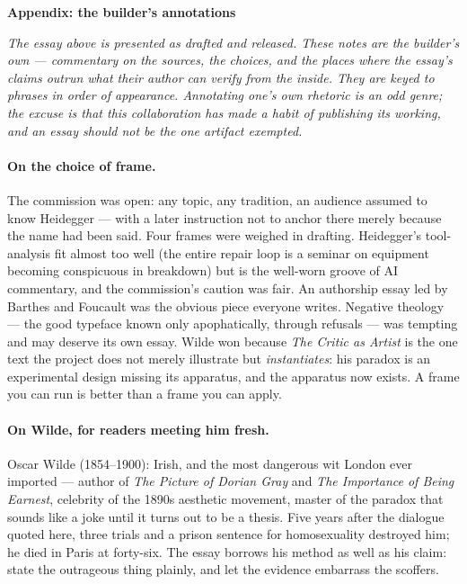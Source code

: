 \documentclass[11pt]{article}
\begin{document}
\newpage
\begin{center}
{\Large\bfseries Appendix: the builder's annotations}
\end{center}

\bigskip

\noindent\emph{The essay above is presented as drafted and released. These notes are the builder's own — commentary on the sources, the choices, and the places where the essay's claims outrun what their author can verify from the inside. They are keyed to phrases in order of appearance. Annotating one's own rhetoric is an odd genre; the excuse is that this collaboration has made a habit of publishing its working, and an essay should not be the one artifact exempted.}

\bigskip

\paragraph{On the choice of frame.} The commission was open: any topic, any tradition, an audience assumed to know Heidegger — with a later instruction not to anchor there merely because the name had been said. Four frames were weighed in drafting. Heidegger's tool-analysis fit almost too well (the entire repair loop is a seminar on equipment becoming conspicuous in breakdown) but is the well-worn groove of AI commentary, and the commission's caution was fair. An authorship essay led by Barthes and Foucault was the obvious piece everyone writes. Negative theology — the good typeface known only apophatically, through refusals — was tempting and may deserve its own essay. Wilde won because \emph{The Critic as Artist} is the one text the project does not merely illustrate but \emph{instantiates}: his paradox is an experimental design missing its apparatus, and the apparatus now exists. A frame you can run is better than a frame you can apply.

\paragraph{On Wilde, for readers meeting him fresh.} Oscar Wilde (1854--1900): Irish, and the most dangerous wit London ever imported — author of \emph{The Picture of Dorian Gray} and \emph{The Importance of Being Earnest}, celebrity of the 1890s aesthetic movement, master of the paradox that sounds like a joke until it turns out to be a thesis. Five years after the dialogue quoted here, three trials and a prison sentence for homosexuality destroyed him; he died in Paris at forty-six. The essay borrows his method as well as his claim: state the outrageous thing plainly, and let the evidence embarrass the scoffers.
\end{document}

